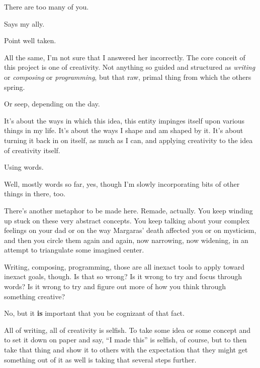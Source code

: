 \begin{paracol}{2}
\begin{leftcolumn}
\begin{ally}
There are too many of you.
\end{ally}
Says my ally.

\begin{ally}
Point well taken.
\end{ally}
All the same, I'm not sure that I answered her incorrectly. The core conceit of this project is one of creativity. Not anything so guided and structured as \emph{writing} or \emph{composing} or \emph{programming}, but that raw, primal thing from which the others spring.

\begin{ally}
Or seep, depending on the day.
\end{ally}
It's about the ways in which this idea, this entity impinges itself upon various things in my life. It's about the ways I shape and am shaped by it. It's about turning it back in on itself, as much as I can, and applying creativity to the idea of creativity itself.

\begin{ally}
Using words.
\end{ally}
Well, mostly words so far, yes, though I'm slowly incorporating bits of other things in there, too.

\begin{ally}
There's another metaphor to be made here. Remade, actually. You keep winding up stuck on these very abstract concepts. You keep talking about your complex feelings on your dad or on the way Margaras' death affected you or on mysticism, and then you circle them again and again, now narrowing, now widening, in an attempt to triangulate some imagined center.
\end{ally}
Writing, composing, programming, those are all inexact tools to apply toward inexact goals, though. Is that so wrong? Is it wrong to try and focus through words? Is it wrong to try and figure out more of how you think through something creative?

\begin{ally}
No, but it \textbf{is} important that you be cognizant of that fact.
\end{ally}
\newpage

\noindent All of writing, all of creativity is selfish. To take some idea or some concept and to set it down on paper and say, ``I made this'' is selfish, of course, but to then take that thing and show it to others with the expectation that they might get something out of it as well is taking that several steps further.


\end{leftcolumn}
\end{paracol}
